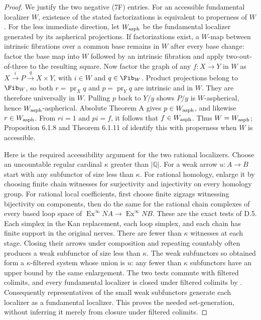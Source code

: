 \begin{proof}
We justify the two negative (7F) entries. For an accessible fundamental localizer $W$, existence of the stated factorizations is equivalent to properness of $W$. For the less immediate direction, let $W_{\rm asph}$ be the fundamental localizer generated by its aspherical projections. If factorizations exist, a $W$-map between intrinsic fibrations over a common base remains in $W$ after every base change: factor the base map into $W$ followed by an intrinsic fibration and apply two-out-of-three to the resulting square. Now factor the graph of any $f:X\to Y$ in $W$ as $X\xrightarrow{i}P\xrightarrow{q}X\times Y$, with $i\in W$ and $q\in\Fib_W$. Product projections belong to $\Fib_W$, so both $r=\operatorname{pr}_Xq$ and $p=\operatorname{pr}_Yq$ are intrinsic and in $W$. They are therefore universally in $W$. Pulling $p$ back to $Y/y$ shows $P/y$ is $W$-aspherical, hence $W_{\rm asph}$-aspherical. Absolute Theorem A gives $p\in W_{\rm asph}$, and likewise $r\in W_{\rm asph}$. From $ri=1$ and $pi=f$, it follows that $f\in W_{\rm asph}$. Thus $W=W_{\rm asph}$; Proposition 6.1.8 and Theorem 6.1.11 of \citet{RCisinski2006} identify this with properness when $W$ is accessible.

Here is the required accessibility argument for the two rational localizers. Choose an uncountable regular cardinal $\kappa$ greater than $|\mathbb Q|$. For a weak arrow $u:A\to B$ start with any subfunctor of size less than $\kappa$. For rational homology, enlarge it by choosing finite chain witnesses for surjectivity and injectivity on every homology group. For rational local coefficients, first choose finite zigzags witnessing bijectivity on components, then do the same for the rational chain complexes of every based loop space of $\operatorname{Ex}^{\infty}NA\to\operatorname{Ex}^{\infty}NB$. These are the exact tests of D.5. Each simplex in the Kan replacement, each loop simplex, and each chain has finite support in the original nerves. There are fewer than $\kappa$ witnesses at each stage. Closing their arrows under composition and repeating countably often produces a weak subfunctor of size less than $\kappa$. The weak subfunctors so obtained form a $\kappa$-filtered system whose union is $u$: any fewer than $\kappa$ subfunctors have an upper bound by the same enlargement. The two tests commute with filtered colimits, and every fundamental localizer is closed under filtered colimits by \citet[Corollary 4.2.22]{RCisinski2006}. Consequently representatives of the small weak subfunctors generate each localizer as a fundamental localizer. This proves the needed set-generation, without inferring it merely from closure under filtered colimits.


\end{proof}
